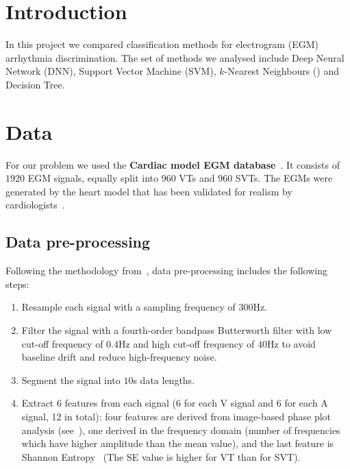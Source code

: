 \section{Introduction}
\label{sec:intro}
In this project we compared classification methods for 
electrogram (EGM) arrhythmia discrimination. The set of methods we 
analysed include Deep Neural Network (DNN), Support Vector Machine 
(SVM), $k$-Nearest Neighbours (\knn) and Decision Tree.

\section{Data}
For our problem we used the  
\textbf{Cardiac model EGM database}~\cite{jiang2016silico}. 
	It consists
	of $1920$ EGM signals, equally split into $960$ VTs and
	$960$ SVTs. The EGMs were generated by the heart
	model that has been validated for realism by 
	cardiologists~\cite{jiang2016silico}.
\subsection{Data pre-processing}
Following the methodology 
from~\cite{hajeb2018automated}, data pre-processing includes the 
following steps:
\begin{enumerate}
	\item Resample each signal with a sampling frequency of $300$Hz.
	\item Filter the signal with a fourth-order bandpass Butterworth 
	filter with low cut-off frequency of $0.4$Hz and high cut-off 
	frequency of $40$Hz to avoid baseline drift and reduce 
	high-frequency noise. 
	\item Segment the signal into $10$s data lengths.
	\item Extract 6 features from each signal (6 for each V signal 
	and 6 for each A signal, 12 in total): four features are derived 
	from image-based phase plot analysis 
	(see~\cite{hajeb2018automated}), one derived in the 
	frequency domain (number of frequencies which have higher 
	amplitude than the mean value), and the last feature is Shannon 
	Entropy~\cite{shannon1948mathematical} (The SE value is higher 
	for VT than for SVT).
\end{enumerate}

